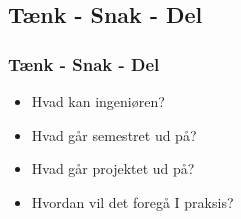 \documentclass[t, aspectratio=169]{beamer}
\begin{document}
\subsection{Tænk - Snak - Del}
\begin{frame}[fragile]
  \frametitle{Tænk - Snak - Del}
  
  \vspace{15mm}
  \begin{itemize}
    \setlength\itemsep{3mm}
    \item Hvad kan ingeniøren?
    \item Hvad går semestret ud på?
    \item Hvad går projektet ud på?
    \item Hvordan vil det foregå I praksis?
  \end{itemize}
  
\end{frame}

\end{document}
